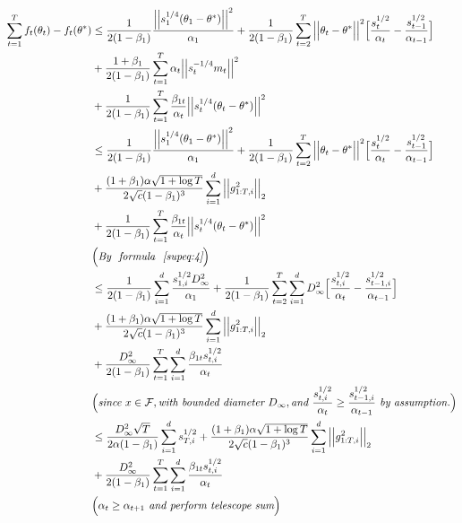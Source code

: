 \documentclass{article}
\begin{document}
\begin{align}
\label{supeq:5}
\sum_{t=1}^T f_t(\theta_t) - f_t(\theta^*) & \leq \frac{1}{2 (1 - \beta_1)} \frac{\Big \vert \Big \vert s_1^{1/4}(\theta_{1} - \theta^*) \Big \vert \Big \vert^2} {\alpha_1} + \frac{1}{2(1-\beta_1)} \sum_{t=2}^T \Big \vert \Big \vert \theta_t - \theta^* \Big \vert \Big \vert^2 \Big[ \frac{s_t^{1/2}}{\alpha_t} - \frac{s_{t-1}^{1/2}}{\alpha_{t-1}} \Big] \nonumber \\
&+ \frac{1+\beta_1}{2(1-\beta_1)} \sum_{t=1}^T \alpha_t \Big \vert \Big \vert s_t^{-1/4}m_t \Big \vert \Big \vert^2 \nonumber \\
& + \frac{1}{2 (1-\beta_{1})} \sum_{t=1}^T \frac{\beta_{1t}}{\alpha_t} \Big \vert \Big \vert s_t^{1/4}(\theta_t - \theta^*) \Big \vert \Big \vert^2 \nonumber \\
& \leq \frac{1}{2 (1 - \beta_1)} \frac{\Big \vert \Big \vert s_1^{1/4}(\theta_{1} - \theta^*) \Big \vert \Big \vert^2} {\alpha_1} + \frac{1}{2(1-\beta_1)} \sum_{t=2}^T \Big \vert \Big \vert \theta_t - \theta^* \Big \vert \Big \vert^2 \Big[ \frac{s_t^{1/2}}{\alpha_t} - \frac{s_{t-1}^{1/2}}{\alpha_{t-1}} \Big] \nonumber \\
&+ {\color{black} \frac{(1+\beta_1 )\alpha \sqrt{1 + \log T}}{2 \sqrt{c} (1 - \beta_1)^3} \sum_{i=1}^d \Big \vert \Big \vert g_{1:T,i}^2 \Big \vert \Big \vert_2}  \nonumber \\
& + \frac{1}{2 (1-\beta_{1})} \sum_{t=1}^T \frac{\beta_{1t}}{\alpha_t} \Big \vert \Big \vert s_t^{1/4}(\theta_t - \theta^*) \Big \vert \Big \vert^2 \nonumber \\
& \Big( \textit{By \ formula ~\eqref{supeq:4}}\Big) \nonumber \\
& \leq \frac{1}{2 (1 - \beta_1)} \sum_{i=1}^d \frac{s_{1,i}^{1/2} D_\infty^2}{\alpha_1} + \frac{1}{2(1-\beta_1)} \sum_{t=2}^T \sum_{i=1}^d D_\infty^2 \Big[ \frac{s_{t,i}^{1/2}}{\alpha_t} - \frac{s_{t-1,i}^{1/2}}{\alpha_{t-1}} \Big] \nonumber \\
&+ {\color{black} \frac{(1+\beta_1 )\alpha \sqrt{1 + \log T}}{2 \sqrt{c} (1 - \beta_1)^3} \sum_{i=1}^d \Big \vert \Big \vert g_{1:T,i}^2 \Big \vert \Big \vert_2 } \nonumber \\
& + \frac{D_\infty^2}{2 (1-\beta_{1})} \sum_{t=1}^T \sum_{i=1}^d \frac{\beta_{1t} s_{t,i}^{1/2} }{\alpha_t} \nonumber \\
& \Big( \textit{since\ } x\in \mathcal{F}, \textit{with\ bounded\ diameter\ } D_\infty, \textit{and\ } \frac{s_{t,i}^{1/2}}{\alpha_t} \geq \frac{s_{t-1,i}^{1/2}}{\alpha_{t-1}} \textit{\ by\ assumption.} \Big) \nonumber \\
& \leq \frac{D_\infty^2 \sqrt{T}}{2 \alpha (1-\beta_1)} \sum_{i=1}^d s_{T,i}^{1/2} + {\color{black}
\frac{(1+\beta_1 )\alpha \sqrt{1 + \log T}}{2 \sqrt{c} (1 - \beta_1)^3} \sum_{i=1}^d \Big \vert \Big \vert g_{1:T,i}^2 \Big \vert \Big \vert_2 } \nonumber \\
&+ \frac{D_\infty^2}{2 (1-\beta_{1})} \sum_{t=1}^T \sum_{i=1}^d \frac{\beta_{1t} s_{t,i}^{1/2} }{\alpha_t} \nonumber \\
& \Big( \alpha_t \geq \alpha_{t+1} \textit{\ and\ perform\ telescope\ sum} \Big)
\end{align} \hfill \qedsymbol
\end{document}

